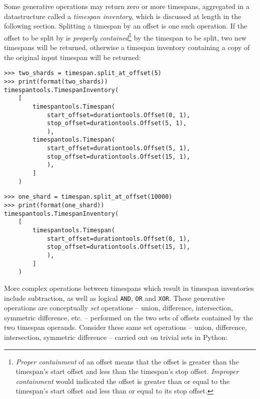 \noindent Some generative operations may return zero or more timespans,
aggregated in a datastructure called a \emph{timespan inventory}, which is
discussed at length in the following section. Splitting a timespan by an offset
is one such operation. If the offset to be split by is \emph{properly
contained}\footnote{\emph{Proper containment} of an offset means that the
offset is greater than the timespan's start offset and less than the timespan's
stop offset. \emph{Improper containment} would indicated the offset is greater
than or equal to the timespan's start offset and less than or equal to its stop
offset.} by the timespan to be split, two new timespans will be returned,
otherwise a timespan inventory containing a copy of the original input timespan
will be returned:

\begin{comment}
<abjad>
two_shards = timespan.split_at_offset(5)
print(format(two_shards))
one_shard = timespan.split_at_offset(10000)
print(format(one_shard))
</abjad>
\end{comment}

\begin{singlespacing}
\vspace{-0.5\baselineskip}
\begin{lstlisting}
>>> two_shards = timespan.split_at_offset(5)
>>> print(format(two_shards))
timespantools.TimespanInventory(
    [
        timespantools.Timespan(
            start_offset=durationtools.Offset(0, 1),
            stop_offset=durationtools.Offset(5, 1),
            ),
        timespantools.Timespan(
            start_offset=durationtools.Offset(5, 1),
            stop_offset=durationtools.Offset(15, 1),
            ),
        ]
    )
\end{lstlisting}
\begin{lstlisting}
>>> one_shard = timespan.split_at_offset(10000)
>>> print(format(one_shard))
timespantools.TimespanInventory(
    [
        timespantools.Timespan(
            start_offset=durationtools.Offset(0, 1),
            stop_offset=durationtools.Offset(15, 1),
            ),
        ]
    )
\end{lstlisting}
\end{singlespacing}

\noindent More complex operations between timespans which result in timespan
inventories include subtraction, as well as logical \texttt{AND}, \texttt{OR}
and \texttt{XOR}. These generative operations are conceptually \emph{set}
operations -- union, difference, intersection, symmetric difference, etc. --
performed on the two sets of offsets contained by the two timespan operands.
Consider these same set operations -- union, difference, intersection,
symmetric difference -- carried out on trivial sets in Python:

